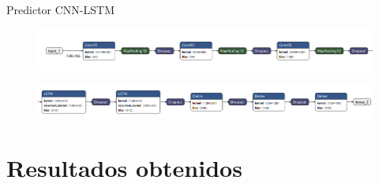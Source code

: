 \documentclass[10pt]{beamer}
\begin{document}
\begin{frame}[fragile]{Predictor CNN-LSTM}
	\vspace{10px}
	\pause
	
	\begin{figure}[H]
		\centering
		\includegraphics[scale=0.35]{Imagenes/cnn-lstm-forecaster-horizontal1.png}
	\end{figure}

	\begin{figure}[H]
		\centering
		\includegraphics[scale=0.35]{Imagenes/cnn-lstm-forecaster-horizontal2.png}
	\end{figure}
	
\end{frame}

\section{Resultados obtenidos}
\end{document}
